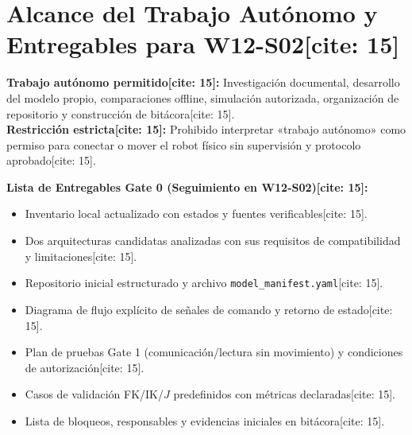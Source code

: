 \documentclass[11pt, a4paper]{article}
\begin{document}
\section{Alcance del Trabajo Autónomo y Entregables para W12-S02[cite: 15]}
\begin{tcolorbox}[colback=yellow!10, colframe=black, left=2mm, right=2mm, top=1mm, bottom=1mm]
    \footnotesize
    \textbf{Trabajo autónomo permitido[cite: 15]:} Investigación documental, desarrollo del modelo propio, comparaciones offline, simulación autorizada, organización de repositorio y construcción de bitácora[cite: 15]. \\
    \textbf{Restricción estricta[cite: 15]:} Prohibido interpretar «trabajo autónomo» como permiso para conectar o mover el robot físico sin supervisión y protocolo aprobado[cite: 15].
\end{tcolorbox}

\noindent\textbf{Lista de Entregables Gate 0 (Seguimiento en W12-S02)[cite: 15]:}
\begin{itemize}
    \item Inventario local actualizado con estados y fuentes verificables[cite: 15].
    \item Dos arquitecturas candidatas analizadas con sus requisitos de compatibilidad y limitaciones[cite: 15].
    \item Repositorio inicial estructurado y archivo \texttt{model\_manifest.yaml}[cite: 15].
    \item Diagrama de flujo explícito de señales de comando y retorno de estado[cite: 15].
    \item Plan de pruebas Gate 1 (comunicación/lectura sin movimiento) y condiciones de autorización[cite: 15].
    \item Casos de validación FK/IK/$J$ predefinidos con métricas declaradas[cite: 15].
    \item Lista de bloqueos, responsables y evidencias iniciales en bitácora[cite: 15].
\end{itemize}
\end{document}
